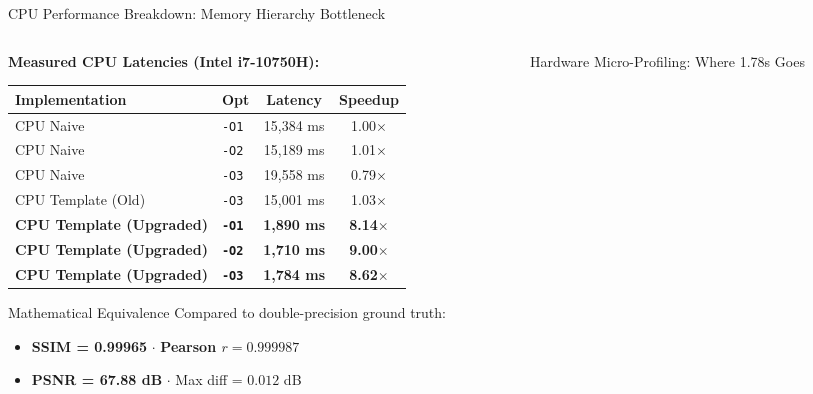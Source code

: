 \documentclass[aspectratio=169,10pt]{beamer}
\begin{document}
\begin{frame}{CPU Performance Breakdown: Memory Hierarchy Bottleneck}
  \begin{columns}[T]
    \begin{column}{0.52\textwidth}
      \textbf{Measured CPU Latencies (Intel i7-10750H):}
      \begin{table}
        \centering
        \scriptsize
        \begin{tabular}{@{}llcc@{}}
          \toprule
          Implementation & Opt & Latency & Speedup \\
          \midrule
          CPU Naive & \texttt{-O1} & 15,384 ms & 1.00$\times$ \\
          CPU Naive & \texttt{-O2} & 15,189 ms & 1.01$\times$ \\
          CPU Naive & \texttt{-O3} & 19,558 ms & 0.79$\times$ \\
          CPU Template (Old) & \texttt{-O3} & 15,001 ms & 1.03$\times$ \\
          \textbf{CPU Template (Upgraded)} & \textbf{\texttt{-O1}} & \textbf{1,890 ms} & \textbf{8.14$\times$} \\
          \textbf{CPU Template (Upgraded)} & \textbf{\texttt{-O2}} & \textbf{1,710 ms} & \textbf{9.00$\times$} \\
          \textbf{CPU Template (Upgraded)} & \textbf{\texttt{-O3}} & \textbf{1,784 ms} & \textbf{8.62$\times$} \\
          \bottomrule
        \end{tabular}
      \end{table}
      \begin{block}{Mathematical Equivalence}
        \scriptsize
        Compared to double-precision ground truth:
        \begin{itemize}
          \item \textbf{SSIM = 0.99965} $\cdot$ \textbf{Pearson $r = 0.999987$}
          \item \textbf{PSNR = 67.88 dB} $\cdot$ Max diff = $0.012$ dB
        \end{itemize}
      \end{block}
    \end{column}
    \begin{column}{0.48\textwidth}
      \begin{block}{Hardware Micro-Profiling: Where 1.78s Goes}

\end{block}
\end{column}
\end{columns}
\end{frame}
\end{document}
